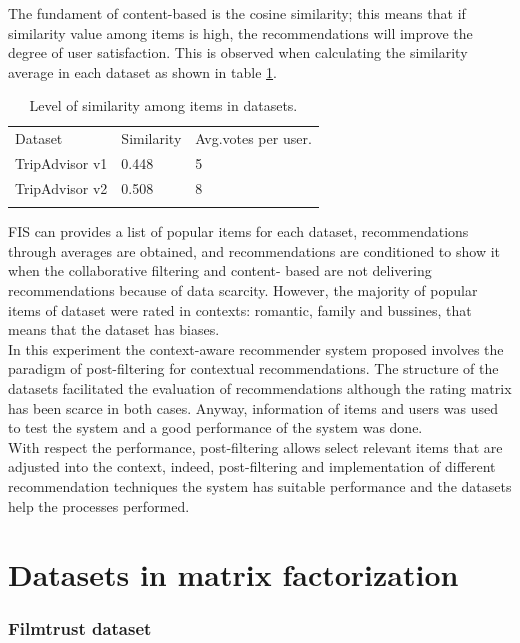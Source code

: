The fundament of content-based is the cosine similarity; this means
that if similarity value among items is high, the recommendations will
improve the degree of user satisfaction. This is observed when
calculating the similarity average in each dataset as shown in table
\ref{tab:5}.
\begin{table}
\centering
\small
\caption{Level of similarity among items in datasets. }
\label{tab:5}      
\begin{tabular}{lll}
\hline\noalign{\smallskip}
Dataset  & Similarity  & Avg.votes per user. \\
\noalign{\smallskip}\hline\noalign{\smallskip}
TripAdvisor v1 & 0.448  & 5  \\
TripAdvisor v2 & 0.508  & 8  \\
\noalign{\smallskip}\hline
\end{tabular}
\end{table}

FIS can provides a list of popular items for each dataset,
recommendations through averages are obtained, and recommendations are
conditioned to show it when the collaborative filtering and content-
based are not delivering recommendations because of data scarcity.
However, the majority of popular items of dataset were rated in contexts: romantic, family and bussines, that means that the dataset has
biases.\\  In this experiment  the context-aware recommender system
proposed involves the paradigm of post-filtering for contextual
recommendations. The structure of the datasets facilitated the
evaluation of recommendations although the rating matrix has been
scarce in both cases. Anyway, information of items and users was used
to test the system and a good performance of the system was done.\\   With
respect the performance, post-filtering allows select relevant
items that are adjusted into the context, indeed, post-filtering and
implementation of different recommendation techniques the system has
suitable performance and the datasets help the processes performed.

\section{Datasets in matrix factorization}

\subsubsection{Filmtrust dataset} 


